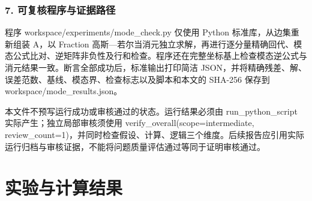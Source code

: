 \documentclass[UTF8,a4paper,11pt]{ctexart}
\begin{document}
\subsubsection*{7. 可复核程序与证据路径}

程序 workspace/experiments/mode\_check.py 仅使用 Python 标准库，从边集重新组装 A，以 Fraction 高斯—若尔当消元独立求解，再进行逐分量精确回代、模态公式比对、逆矩阵非负性及行和检查。程序还在完整坐标基上检查模态逆公式与消元结果一致。断言全部成功后，标准输出打印简洁 JSON，并将精确残差、解、误差范数、基线、模态界、检查标志以及脚本和本文的 SHA-256 保存到 workspace/mode\_results.json。

本文件不预写运行成功或审核通过的状态。运行结果必须由 run\_python\_script 实际产生；独立局部审核须使用 verify\_overall(scope=intermediate, review\_count=1)，并同时检查假设、计算、逻辑三个维度。后续报告应引用实际运行归档与审核证据，不能将问题质量评估通过等同于证明审核通过。
\par{}\par
\section{实验与计算结果}
\end{document}
